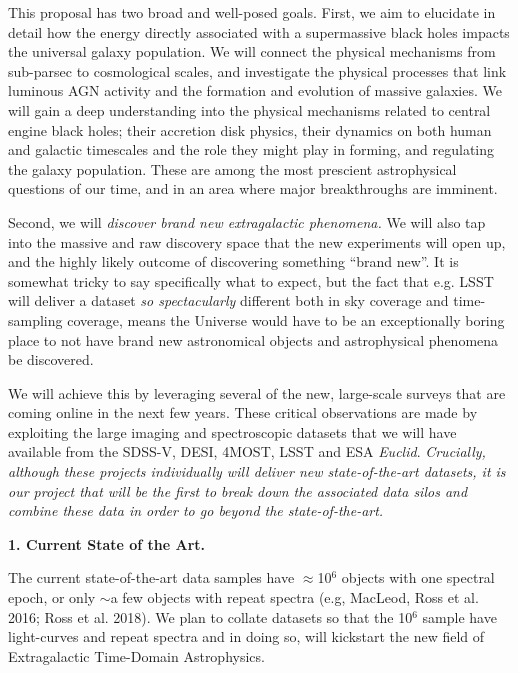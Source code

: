 \documentclass[oneside, a4paper, onecolumn, 11pt]{article}
\begin{document}
\smallskip
\smallskip
\noindent
This proposal has two broad and well-posed goals.  First, we aim to
elucidate in detail how the energy directly associated with a
supermassive black holes impacts the universal galaxy population.  We
will connect the physical mechanisms from sub-parsec to cosmological
scales, and investigate the physical processes that link luminous
AGN activity and the formation and evolution of massive galaxies.
We will gain a deep understanding into the physical mechanisms
related to central engine black holes; their accretion disk physics,
their dynamics on both human and galactic timescales and the role they
might play in forming, and regulating the galaxy population. These are
among the most prescient astrophysical questions of our time, and in
an area where major breakthroughs are imminent.

\smallskip
\smallskip
\noindent
Second, we will {\it discover brand new extragalactic phenomena.}
We will also tap into the massive and raw discovery space
that the new experiments will open up, and the highly likely outcome
of discovering something ``brand new''. It is somewhat tricky to say
specifically what to expect, but the fact that e.g. LSST will deliver
a dataset {\it so spectacularly} different both in sky coverage and
time-sampling coverage, means the Universe would have to be an
exceptionally boring place to not have brand new astronomical objects
and astrophysical phenomena be discovered.

\smallskip
\smallskip
\noindent
We will achieve this by leveraging several of the new, large-scale
surveys that are coming online in the next few years. These critical
observations are made by exploiting the large imaging and
spectroscopic datasets that we will have available from the SDSS-V,
DESI, 4MOST, LSST and ESA {\it Euclid}. {\it Crucially, although these 
projects individually will deliver new state-of-the-art datasets, it is 
our project that will be the first to break down the associated data 
silos and combine these data in order to go beyond the state-of-the-art.}

\medskip
\medskip
\noindent
\large
{\bf{\textcolor{Cerulean}{1. Current State of the Art.}}}
\normalsize

\noindent
The current state-of-the-art data samples have $\approx$10$^{6}$
objects with one spectral epoch, or only $\sim$a few objects with
repeat spectra (e.g, MacLeod, Ross et al. 2016; Ross et al. 2018).  We
plan to collate datasets so that the 10$^{6}$ sample have
light-curves and repeat spectra and in doing so, will kickstart the
new field of Extragalactic Time-Domain Astrophysics.
\end{document}
